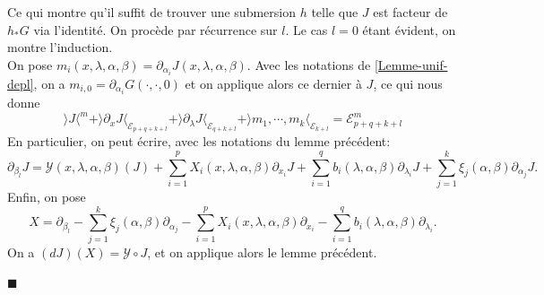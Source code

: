 \documentclass[memoire.tex]{subfiles}
\begin{document}
Ce qui montre qu'il suffit de trouver une submersion $h$ telle que $J$ est facteur de $h_{*}G$ via l'identité. On procède par récurrence sur $l$. Le cas $l=0$ étant évident, on montre l'induction.\\
On pose $m_i(x,\lambda,\alpha,\beta)=\partial_{\alpha_i} J(x,\lambda,\alpha,\beta)$. Avec les notations de \ref{Lemme-unif-depl}, on a $m_{i,0}=\partial_{\alpha_i}G(\cdot,\cdot,0)$ et on applique alors ce dernier à $J$, ce qui nous donne
\begin{equation*}
    \rangle J\langle^m+\rangle  \partial_x J\langle_{\mathcal{E}_{p+q+k+l}}
    +\rangle  \partial_\lambda J\langle_{\mathcal{E}_{q+k+l}}
    +\rangle m_1,\cdots,m_k\langle_{\mathcal{E}_{k+l}}=\mathcal{E}_{p+q+k+l}^m
\end{equation*}
En particulier, on peut écrire, avec les notations du lemme précédent:
\begin{equation*}
    \partial_{\beta_{l}}J=
    \mathcal{Y}(x,\lambda,
    \alpha,\beta)(J)+\sum_{i=1}^{p}X_i(x,\lambda,\alpha,\beta)\partial_{x_i}J+\sum_{i=1}^{q}b_i(\lambda,\alpha,\beta)\partial_{\lambda_i}J+\sum_{j=1}^{k}\xi_j(\alpha,\beta)\partial_{\alpha_j} J.
\end{equation*}
Enfin, on pose 
\begin{equation*}
    X=\partial_{\beta_l}-\sum_{j=1}^{k}\xi_j(\alpha,\beta)\partial_{\alpha_j}-\sum_{i=1}^{p}X_i(x,\lambda,\alpha,\beta)\partial_{x_i}-\sum_{i=1}^{q}b_i(\lambda,\alpha,\beta)\partial_{\lambda_i}.
\end{equation*}
On a $(dJ)(X)=\mathcal{Y}\circ J$, et on applique alors le lemme précédent.
{\unskip\nobreak\hfill\textcolor{color-prop}{$\blacksquare$}\par}





\newpage
\end{document}
